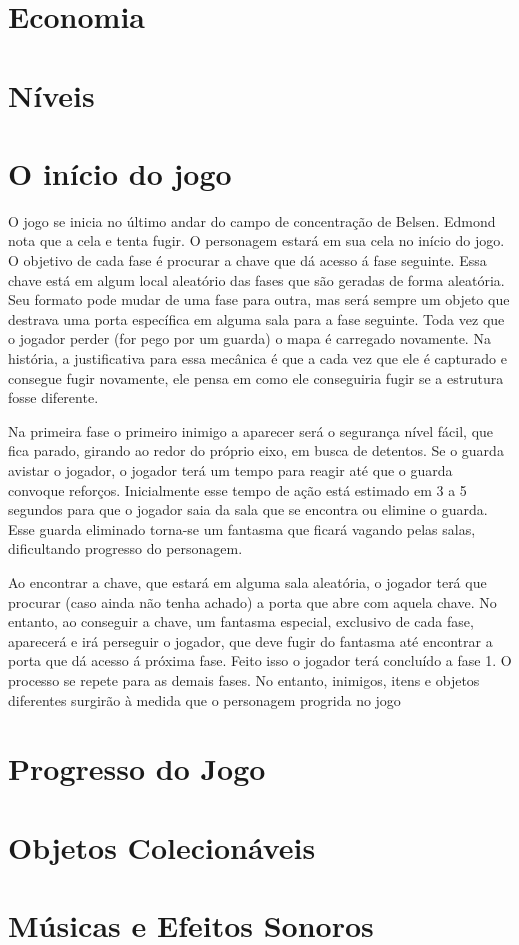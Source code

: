 \documentclass{article}
\begin{document}
\section{Economia}
\section{Níveis}

\section{O início do jogo}
    O jogo se inicia no último andar do campo de concentração de Belsen. Edmond nota que a cela e tenta fugir. O personagem estará em sua cela no início do jogo. O objetivo de cada fase é procurar a chave que dá acesso á fase seguinte. Essa chave está em algum local aleatório das fases que são geradas de forma aleatória. Seu formato pode mudar de uma fase para outra, mas será sempre um objeto que destrava uma porta específica em alguma sala para a fase seguinte. Toda vez que o jogador perder (for pego por um guarda) o mapa é carregado novamente. Na história, a justificativa para essa mecânica é que a cada vez que ele é capturado e consegue fugir novamente, ele pensa em como ele conseguiria fugir se a estrutura fosse diferente.
  
    Na primeira fase o primeiro inimigo a aparecer será o segurança nível fácil, que fica parado, girando ao redor do próprio eixo, em busca de detentos. Se o guarda avistar o jogador, o jogador terá um tempo para reagir até que o guarda convoque reforços. Inicialmente esse tempo de ação está estimado em 3 a 5 segundos para que o jogador saia da sala que se encontra ou elimine o guarda. Esse guarda eliminado torna-se um fantasma que ficará vagando pelas salas, dificultando progresso do personagem.
  
    Ao encontrar a chave, que estará em alguma sala aleatória, o jogador terá que procurar (caso ainda não tenha achado) a porta que abre com aquela chave. No entanto, ao conseguir a chave, um fantasma especial, exclusivo de cada fase, aparecerá e irá perseguir o jogador, que deve fugir do fantasma até encontrar a porta que dá acesso á próxima fase. Feito isso o jogador terá concluído a fase 1. O processo se repete para as demais fases. No entanto, inimigos, itens e objetos diferentes surgirão à medida que o personagem progrida no jogo

\section{Progresso do Jogo}
\section{Objetos Colecionáveis}
\section{Músicas e Efeitos Sonoros}
\end{document}
